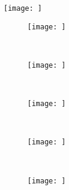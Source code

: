 
\begin{figure}[H]
    \centering
    \texttt{[image: ]}
    \caption{}
    \label{fig:}
\end{figure}

\begin{figure}[H]
	\centering
    \begin{subfigure}[b]{0.4\textwidth}
        \texttt{[image: ]}
        \caption{}
        \label{fig:}
    \end{subfigure}
    ~
	\begin{subfigure}[b]{0.4\textwidth}
        \texttt{[image: ]}
        \caption{}
        \label{fig:}
    \end{subfigure}
    ~
    \caption{}
    \label{fig:}
\end{figure}

\begin{figure}[H]
	\centering
    \begin{subfigure}[b]{0.3\textwidth}
        \texttt{[image: ]}
        \caption{}
        \label{fig:}
    \end{subfigure}
    ~
	\begin{subfigure}[b]{0.3\textwidth}
        \texttt{[image: ]}
        \caption{}
        \label{fig:}
    \end{subfigure}
    ~
    \begin{subfigure}[b]{0.3\textwidth}
        \texttt{[image: ]}
        \caption{}
        \label{fig:}
    \end{subfigure}
    ~
    \caption{}
    \label{fig:}
\end{figure}
